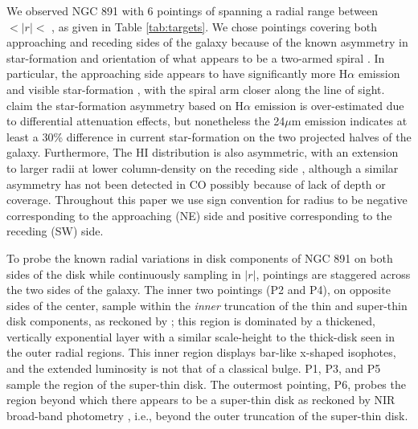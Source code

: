 We observed NGC 891 with 6 pointings of \GP spanning a radial range
between  $< \left|r\right| <$ ,
as given in Table \ref{tab:targets}. We chose pointings covering both
approaching and receding sides of the galaxy because of the known
asymmetry in star-formation and orientation of what appears to be a
two-armed spiral \citep{Xilouris99,Schechtman-Rook12}. In particular,
the approaching side appears to have significantly more H$\alpha$
emission and visible star-formation \citep{Rand90,Howk00,Kamphuis07a},
with the spiral arm closer along the line of sight. \cite{Kamphuis07b}
claim the star-formation asymmetry based on H$\alpha$ emission is
over-estimated due to differential attenuation effects, but
nonetheless the 24$\mu$m emission indicates at least a 30\% difference
in current star-formation on the two projected halves of the
galaxy. Furthermore, The HI distribution is also asymmetric, with an
extension to larger radii at lower column-density on the receding side
\citep{Swaters97,Oosterloo07}, although a similar asymmetry has not
been detected in CO \citep{Scoville93} possibly because of lack of
depth or coverage. Throughout this paper we use sign convention for
radius to be negative corresponding to the approaching (NE) side and
positive corresponding to the receding (SW) side.

To probe the known radial variations in disk components of NGC 891 on
both sides of the disk while continuously sampling in $|r|$, pointings
are staggered across the two sides of the galaxy. The inner two \GP
pointings (P2 and P4), on opposite sides of the center, sample within
the {\it inner} truncation of the thin and super-thin disk components,
as reckoned by \citet{Schechtman-Rook13}; this region is dominated by
a thickened, vertically exponential layer with a similar scale-height
to the thick-disk seen in the outer radial regions. This inner region
displays bar-like x-shaped isophotes, and the extended luminosity is
not that of a classical bulge. P1, P3, and P5 sample the region of the
super-thin disk. The outermost \GP pointing, P6, probes the region
beyond which there appears to be a super-thin disk as reckoned by NIR
broad-band photometry \citep{Schechtman-Rook12}, i.e., beyond the
outer truncation of the super-thin disk.

